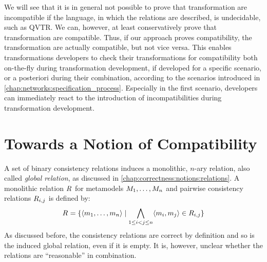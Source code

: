 
We will see that it is in general not possible to prove that transformation are incompatible if the language, in which the relations are described, is undecidable, such as \gls{QVTR}.
We can, however, at least conservatively prove that transformation are compatible.
Thus, if our approach proves compatibility, the transformation are actually compatible, but not vice versa.
This enables transformations developers to check their transformations for compatibility both on-the-fly during transformation development, if developed for a specific scenario, or a posteriori during their combination, according to the scenarios introduced in \autoref{chap:networks:specification_process}.
Especially in the first scenario, developers can immediately react to the introduction of incompatibilities during transformation development.



\section{Towards a Notion of Compatibility}

A set of binary consistency relations induces a monolithic, $n$-ary relation, also called \emph{global relation}, as discussed in \autoref{chap:correctness:notions:relations}.
A monolithic relation $R_{}$ for metamodels $M_{1}, \dots, M_{n}$ and pairwise consistency relations $R_{i,j}$ is defined by:
\begin{align*}
    R_{} = \{ \langle m_{1}, \dots, m_{n} \rangle \mid \bigwedge\limits_{1 \le i < j \le n} \langle m_{i}, m_{j} \rangle \in R_{i,j} \}
\end{align*}
As discussed before, the consistency relations are correct by definition and so is the induced global relation, even if it is empty.
It is, however, unclear whether the relations are \enquote{reasonable} in combination.

